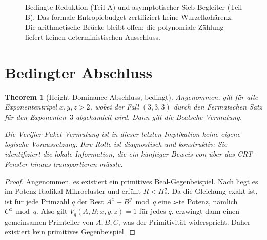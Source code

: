 \documentclass[11pt,a4paper]{article}
\newtheorem{theorem}{Theorem}[section]
\begin{document}
\begin{figure}[htbp]
{}
\caption{Bedingte Reduktion (Teil A) und asymptotischer Sieb-Begleiter (Teil B). Das formale Entropiebudget zertifiziert keine Wurzelkohärenz. Die arithmetische Brücke bleibt offen; die polynomiale Zählung liefert keinen deterministischen Ausschluss.}
\label{fig:bhd_architecture}
\end{figure}

\section{Bedingter Abschluss}

\begin{theorem}[Height-Dominance-Abschluss, bedingt]
\label{thm:conditional-closure}
Angenommen,  gilt für alle Exponententripel $x,y,z>2$, wobei der Fall $(3,3,3)$ durch den Fermatschen Satz für den Exponenten~$3$ abgehandelt wird. Dann gilt die Bealsche Vermutung.

Die Verifier-Paket-Vermutung  ist in dieser letzten Implikation keine eigene logische Voraussetzung. Ihre Rolle ist diagnostisch und konstruktiv: Sie identifiziert die lokale Information, die ein künftiger Beweis von  über das CRT-Fenster hinaus transportieren müsste.
\end{theorem}

\begin{proof}
Angenommen, es existiert ein primitives Beal-Gegenbeispiel. Nach  liegt es im Potenz-Radikal-Mikrocluster und erfüllt $R < H_*^{\sigma}$. Da die Gleichung exakt ist, ist für jede Primzahl $q$ der Rest $A^x+B^y \bmod q$ eine $z$-te Potenz, nämlich $C^z \bmod q$. Also gilt $V_q(A,B;x,y,z)=1$ für jedes $q$.  erzwingt dann einen gemeinsamen Primteiler von $A,B,C$, was der Primitivität widerspricht. Daher existiert kein primitives Gegenbeispiel.
\end{proof}
\end{document}
